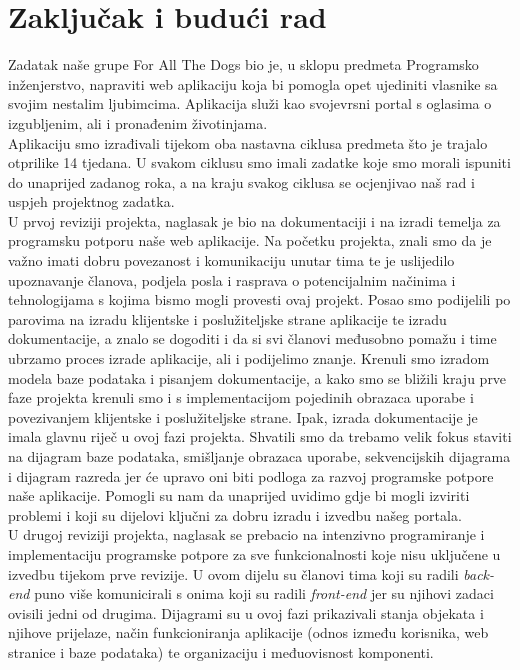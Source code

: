 \chapter{Zaključak i budući rad}
		
		Zadatak naše grupe For All The Dogs bio je, u sklopu predmeta Programsko inženjerstvo, napraviti web aplikaciju koja bi pomogla opet ujediniti vlasnike sa svojim nestalim ljubimcima. Aplikacija služi kao svojevrsni portal s oglasima o izgubljenim, ali i pronađenim životinjama.\\
		Aplikaciju smo izrađivali tijekom oba nastavna ciklusa predmeta što je trajalo otprilike 14 tjedana. U svakom ciklusu smo imali zadatke koje smo morali ispuniti do unaprijed zadanog roka, a na kraju svakog ciklusa se ocjenjivao naš rad i uspjeh projektnog zadatka.\\
		U prvoj reviziji projekta, naglasak je bio na dokumentaciji i na izradi temelja za programsku potporu naše web aplikacije. Na početku projekta, znali smo da je važno imati dobru povezanost i komunikaciju unutar tima te je uslijedilo upoznavanje članova, podjela posla i rasprava o potencijalnim načinima i tehnologijama s kojima bismo mogli provesti ovaj projekt. Posao smo podijelili po parovima na izradu klijentske i poslužiteljske strane aplikacije te izradu dokumentacije, a znalo se dogoditi i da si svi članovi međusobno pomažu i time ubrzamo proces izrade aplikacije, ali i podijelimo znanje. Krenuli smo izradom modela baze podataka i pisanjem dokumentacije, a kako smo se bližili kraju prve faze projekta krenuli smo i s implementacijom pojedinih obrazaca uporabe i povezivanjem klijentske i poslužiteljske strane. Ipak, izrada dokumentacije je imala glavnu riječ u ovoj fazi projekta. Shvatili smo da trebamo velik fokus staviti na dijagram baze podataka, smišljanje obrazaca uporabe, sekvencijskih dijagrama i dijagram razreda jer će upravo oni biti podloga za razvoj programske potpore naše aplikacije. Pomogli su nam da unaprijed uvidimo gdje bi mogli izviriti problemi i koji su dijelovi ključni za dobru izradu i izvedbu našeg portala.\\
		U drugoj reviziji projekta, naglasak se prebacio na intenzivno programiranje i implementaciju programske potpore za sve funkcionalnosti koje nisu uključene u izvedbu tijekom prve revizije. U ovom dijelu su članovi tima koji su radili \textit{back-end} puno više komunicirali s onima koji su radili \textit{front-end} jer su njihovi zadaci ovisili jedni od drugima. Dijagrami su u ovoj fazi prikazivali stanja objekata i njihove prijelaze, način funkcioniranja aplikacije (odnos između korisnika, web stranice i baze podataka) te organizaciju i međuovisnost komponenti.\\
